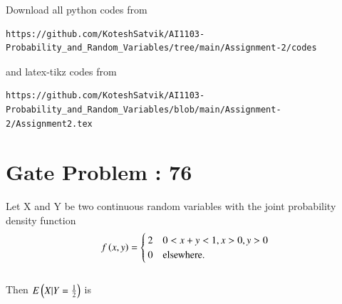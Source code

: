 \documentclass[journal,12pt,twocolumn]{IEEEtran}
\begin{document}
\author{Songa Kotesh Satvik}
\maketitle
\newpage
\bigskip
\renewcommand{\thefigure}{\theenumi}
\renewcommand{\thetable}{\theenumi}
Download all python codes from 
\begin{lstlisting}
https://github.com/KoteshSatvik/AI1103-Probability_and_Random_Variables/tree/main/Assignment-2/codes
\end{lstlisting}
%
and latex-tikz codes from 
%
\begin{lstlisting}
https://github.com/KoteshSatvik/AI1103-Probability_and_Random_Variables/blob/main/Assignment-2/Assignment2.tex
\end{lstlisting}
\section{\textbf{Gate Problem : 76}}
Let X and Y be two continuous random variables with the joint probability density function 
\begin{align}
f\left(x,y\right)= 
\begin{cases}
2 & 0<x+y<1, x>0, y>0 \\
0 & \text{elsewhere}.
\end{cases}   
\end{align}
\\Then $E\left(X|Y=\frac{1}{2}\right)$ is 
\end{document}
